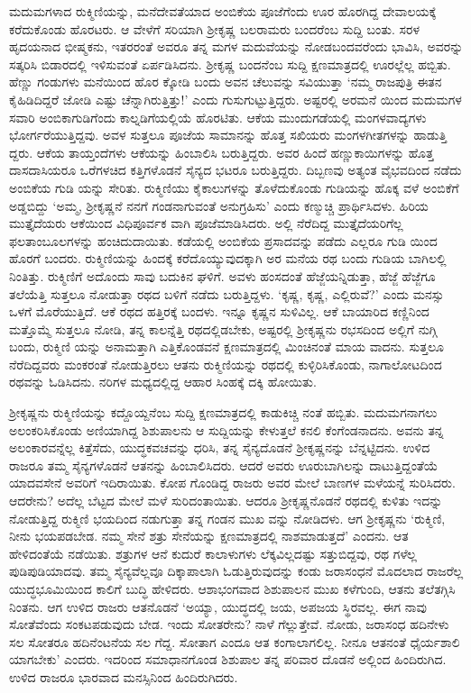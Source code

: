 ಮದುಮಗಳಾದ ರುಕ್ಮಿಣಿಯನ್ನು, ಮನೆದೇವತೆಯಾದ ಅಂಬಿಕೆಯ ಪೂಜೆಗೆಂದು ಊರ ಹೊರಗಿದ್ದ ದೇವಾಲಯಕ್ಕೆ ಕರೆದುಕೊಂಡು ಹೊರಟರು. ಆ ವೇಳೆಗೆ ಸರಿಯಾಗಿ ಶ್ರೀಕೃಷ್ಣ ಬಲರಾಮರು ಬಂದರೆಂಬ ಸುದ್ದಿ ಬಂತು. ಸರಳ ಹೃದಯನಾದ ಭೀಷ್ಮಕನು, ಇತರರಂತೆ ಅವರೂ ತನ್ನ ಮಗಳ ಮದುವೆಯನ್ನು ನೋಡಬಂದವರೆಂದು ಭಾವಿಸಿ, ಅವರನ್ನು ಸತ್ಕರಿಸಿ ಬಿಡಾರದಲ್ಲಿ ಇಳಿಸುವಂತೆ ಏರ್ಪಡಿಸಿದನು. ಶ್ರೀಕೃಷ್ಣ ಬಂದನೆಂಬ ಸುದ್ದಿ ಕ್ಷಣಮಾತ್ರದಲ್ಲಿ ಊರಲ್ಲೆಲ್ಲ ಹಬ್ಬಿತು. ಹೆಣ್ಣು ಗಂಡುಗಳು ಮನೆಯಿಂದ ಹೊರ ಕ್ಕೋಡಿ ಬಂದು ಅವನ ಚೆಲುವನ್ನು ಸವಿಯುತ್ತಾ ‘ನಮ್ಮ ರಾಜಪುತ್ರಿ ಈತನ ಕೈಹಿಡಿದಿದ್ದರೆ ಜೋಡಿ ಎಷ್ಟು ಚೆನ್ನಾಗಿರುತ್ತಿತ್ತು!’ ಎಂದು ಗುಸುಗುಟ್ಟುತ್ತಿದ್ದರು. ಅಷ್ಟರಲ್ಲಿ ಅರಮನೆ ಯಿಂದ ಮದುಮಗಳ ಸವಾರಿ ಅಂಬಿಕಾಗುಡಿಗೆಂದು ಕಾಲ್ನಡಿಗೆಯಲ್ಲಿಯೆ ಹೊರಟಿತು. ಆಕೆಯ ಮುಂದುಗಡೆಯಲ್ಲಿ ಮಂಗಳವಾದ್ಯಗಳು ಭೋರ್ಗರೆಯುತ್ತಿದ್ದವು. ಅವಳ ಸುತ್ತಲೂ ಪೂಜೆಯ ಸಾಮಾನನ್ನು ಹೊತ್ತ ಸಖಿಯರು ಮಂಗಳಗೀತಗಳನ್ನು ಹಾಡುತ್ತಿ ದ್ದರು. ಆಕೆಯ ತಾಯ್ತಂದೆಗಳು ಆಕೆಯನ್ನು ಹಿಂಬಾಲಿಸಿ ಬರುತ್ತಿದ್ದರು. ಅವರ ಹಿಂದೆ ಹಣ್ಣುಕಾಯಿಗಳನ್ನು ಹೊತ್ತ ದಾಸದಾಸಿಯರೂ ಒರೆಗಳಚಿದ ಕತ್ತಿಗಳೊಡನೆ ಸೈನ್ಯದ ಭಟರೂ ಬರುತ್ತಿದ್ದರು. ದಿಬ್ಬಣವು ಅತ್ಯಂತ ವೈಭವದಿಂದ ನಡೆದು ಅಂಬಿಕೆಯ ಗುಡಿ ಯನ್ನು ಸೇರಿತು. ರುಕ್ಮಿಣಿಯು ಕೈಕಾಲುಗಳನ್ನು ತೊಳೆದುಕೊಂಡು ಗುಡಿಯನ್ನು ಹೊಕ್ಕ ವಳೆ ಅಂಬಿಕೆಗೆ ಅಡ್ಡಬಿದ್ದು ‘ಅಮ್ಮ, ಶ್ರೀಕೃಷ್ಣನೆ ನನಗೆ ಗಂಡನಾಗುವಂತೆ ಅನುಗ್ರಹಿಸು’ ಎಂದು ಕಣ್ಮುಚ್ಚಿ ಪ್ರಾರ್ಥಿಸಿದಳು. ಹಿರಿಯ ಮುತ್ತೈದೆಯರು ಆಕೆಯಿಂದ ವಿಧಿಪೂರ್ವಕ ವಾಗಿ ಪೂಜೆಮಾಡಿಸಿದರು. ಅಲ್ಲಿ ನೆರೆದಿದ್ದ ಮುತ್ತೈದೆಯರಿಗೆಲ್ಲ ಫಲತಾಂಬೂಲಗಳನ್ನು ಹಂಚಿದುದಾಯಿತು. ಕಡೆಯಲ್ಲಿ ಅಂಬಿಕೆಯ ಪ್ರಸಾದವನ್ನು ಪಡೆದು ಎಲ್ಲರೂ ಗುಡಿ ಯಿಂದ ಹೊರಗೆ ಬಂದರು. ರುಕ್ಮಿಣಿಯನ್ನು ಹಿಂದಕ್ಕೆ ಕರೆದೊಯ್ಯುವುದಕ್ಕಾಗಿ ಅರ ಮನೆಯ ರಥ ಬಂದು ಗುಡಿಯ ಬಾಗಿಲಲ್ಲಿ ನಿಂತಿತ್ತು. ರುಕ್ಮಿಣಿಗೆ ಅದೊಂದು ಸಾವು ಬದುಕಿನ ಘಳಿಗೆ. ಅವಳು ಹಂಸದಂತೆ ಹೆಜ್ಜೆಯನ್ನಿಡುತ್ತಾ, ಹೆಜ್ಜೆ ಹೆಜ್ಜೆಗೂ ತಲೆಯೆತ್ತಿ ಸುತ್ತಲೂ ನೋಡುತ್ತಾ ರಥದ ಬಳಿಗೆ ನಡೆದು ಬರುತ್ತಿದ್ದಳು. ‘ಕೃಷ್ಣ, ಕೃಷ್ಣ, ಎಲ್ಲಿರುವೆ?’ ಎಂದು ಮನಸ್ಸು ಒಳಗೆ ಮೊರೆಯುತ್ತಿದೆ. ಆಕೆ ರಥದ ಹತ್ತಿರಕ್ಕೆ ಬಂದಳು. ಇನ್ನೂ ಕೃಷ್ಣನ ಸುಳಿವಿಲ್ಲ. ಆಕೆ ಬಾಯಾರಿದ ಕಣ್ಣಿನಿಂದ ಮತ್ತೊಮ್ಮೆ ಸುತ್ತಲೂ ನೋಡಿ, ತನ್ನ ಕಾಲನ್ನೆತ್ತಿ ರಥದಲ್ಲಿಡಬೇಕು, ಅಷ್ಟರಲ್ಲಿ ಶ್ರೀಕೃಷ್ಣನು ರಭಸದಿಂದ ಅಲ್ಲಿಗೆ ನುಗ್ಗಿ ಬಂದು, ರುಕ್ಮಿಣಿ ಯನ್ನು ಅನಾಮತ್ತಾಗಿ ಎತ್ತಿಕೊಂಡವನೆ ಕ್ಷಣಮಾತ್ರದಲ್ಲಿ ಮಿಂಚಿನಂತೆ ಮಾಯ ವಾದನು. ಸುತ್ತಲೂ ನೆರೆದಿದ್ದವರು ಮಂಕರಂತೆ ನೋಡುತ್ತಿರಲು ಆತನು ರುಕ್ಮಿಣಿಯನ್ನು ರಥದಲ್ಲಿ ಕುಳ್ಳಿರಿಸಿಕೊಂಡು, ನಾಗಾಲೋಟದಿಂದ ರಥವನ್ನು ಓಡಿಸಿದನು. ನರಿಗಳ ಮಧ್ಯದಲ್ಲಿದ್ದ ಆಹಾರ ಸಿಂಹಕ್ಕೆ ದಕ್ಕಿ ಹೋಯಿತು.

ಶ್ರೀಕೃಷ್ಣನು ರುಕ್ಮಿಣಿಯನ್ನು ಕದ್ದೊಯ್ದನೆಂಬ ಸುದ್ದಿ ಕ್ಷಣಮಾತ್ರದಲ್ಲಿ ಕಾಡುಕಿಚ್ಚಿ ನಂತೆ ಹಬ್ಬಿತು. ಮದುಮಗನಾಗಲು ಅಲಂಕರಿಸಿಕೊಂಡು ಅಣಿಯಾಗಿದ್ದ ಶಿಶುಪಾಲನು ಆ ಸುದ್ದಿಯನ್ನು ಕೇಳುತ್ತಲೆ ಕನಲಿ ಕೆಂಗೆಂಡನಾದನು. ಅವನು ತನ್ನ ಅಲಂಕಾರವನ್ನೆಲ್ಲ ಕಿತ್ತೆಸೆದು, ಯುದ್ಧಕವಚವನ್ನು ಧರಿಸಿ, ತನ್ನ ಸೈನ್ಯದೊಡನೆ ಶ್ರೀಕೃಷ್ಣನನ್ನು ಬೆನ್ನಟ್ಟಿದನು. ಉಳಿದ ರಾಜರೂ ತಮ್ಮ ಸೈನ್ಯಗಳೊಡನೆ ಆತನನ್ನು ಹಿಂಬಾಲಿಸಿದರು. ಆದರೆ ಅವರು ಊರುಬಾಗಿಲನ್ನು ದಾಟುತ್ತಿದ್ದಂತೆಯೆ ಯಾದವಸೇನೆ ಅವರಿಗೆ ಇದಿರಾಯಿತು. ಕೋಪ ಗೊಂಡಿದ್ದ ರಾಜರು ಅವರ ಮೇಲೆ ಬಾಣಗಳ ಮಳೆಯನ್ನೆ ಸುರಿಸಿದರು. ಆದರೇನು? ಅದೆಲ್ಲ ಬೆಟ್ಟದ ಮೇಲೆ ಮಳೆ ಸುರಿದಂತಾಯಿತು. ಆದರೂ ಶ್ರೀಕೃಷ್ಣನೊಡನೆ ರಥದಲ್ಲಿ ಕುಳಿತು ಇದನ್ನು ನೋಡುತ್ತಿದ್ದ ರುಕ್ಮಿಣಿ ಭಯದಿಂದ ನಡುಗುತ್ತಾ ತನ್ನ ಗಂಡನ ಮುಖ ವನ್ನು ನೋಡಿದಳು. ಆಗ ಶ್ರೀಕೃಷ್ಣನು ‘ರುಕ್ಮಿಣಿ, ನೀನು ಭಯಪಡಬೇಡ. ನಮ್ಮ ಸೇನೆ ಶತ್ರು ಸೇನೆಯನ್ನು ಕ್ಷಣಮಾತ್ರದಲ್ಲಿ ನಾಶಮಾಡುತ್ತದೆ’ ಎಂದನು. ಆತ ಹೇಳಿದಂತೆಯೆ ನಡೆಯಿತು. ಶತ್ರುಗಳ ಆನೆ ಕುದುರೆ ಕಾಲಾಳುಗಳು ಲೆಕ್ಕವಿಲ್ಲದಷ್ಟು ಸತ್ತುಬಿದ್ದವು, ರಥ ಗಳೆಲ್ಲ ಪುಡಿಪುಡಿಯಾದವು. ತಮ್ಮ ಸೈನ್ಯವೆಲ್ಲವೂ ದಿಕ್ಕಾಪಾಲಾಗಿ ಓಡುತ್ತಿರುವುದನ್ನು ಕಂಡು ಜರಾಸಂಧನೆ ಮೊದಲಾದ ರಾಜರೆಲ್ಲ ಯುದ್ಧಭೂಮಿಯಿಂದ ಕಾಲಿಗೆ ಬುದ್ಧಿ ಹೇಳಿದರು. ಆಶಾಭಂಗವಾದ ಶಿಶುಪಾಲನ ಮುಖ ಕಳೆಗುಂದಿ, ಆತನು ತಲೆತಗ್ಗಿಸಿ ನಿಂತನು. ಆಗ ಉಳಿದ ರಾಜರು ಆತನೊಡನೆ ‘ಅಯ್ಯಾ, ಯುದ್ಧದಲ್ಲಿ ಜಯ, ಅಪಜಯ ಸ್ಥಿರವಲ್ಲ. ಈಗ ನಾವು ಸೋತೆವೆಂದು ಸಂಕಟಪಡುವುದು ಬೇಡ. ಇಂದು ಸೋತರೇನು? ನಾಳೆ ಗೆಲ್ಲುತ್ತೇವೆ. ನೋಡು, ಜರಾಸಂಧ ಹದಿನೇಳು ಸಲ ಸೋತರೂ ಹದಿನೆಂಟನೆಯ ಸಲ ಗೆದ್ದ. ಸೋತಾಗ ಎಂದೂ ಆತ ಕಂಗಾಲಾಗಲಿಲ್ಲ. ನೀನೂ ಆತನಂತೆ ಧೈರ್ಯಶಾಲಿ ಯಾಗಬೇಕು’ ಎಂದರು. ಇದರಿಂದ ಸಮಾಧಾನಗೊಂಡ ಶಿಶುಪಾಲ ತನ್ನ ಪರಿವಾರ ದೊಡನೆ ಅಲ್ಲಿಂದ ಹಿಂದಿರುಗಿದ. ಉಳಿದ ರಾಜರೂ ಭಾರವಾದ ಮನಸ್ಸಿನಿಂದ ಹಿಂದಿರುಗಿದರು.

